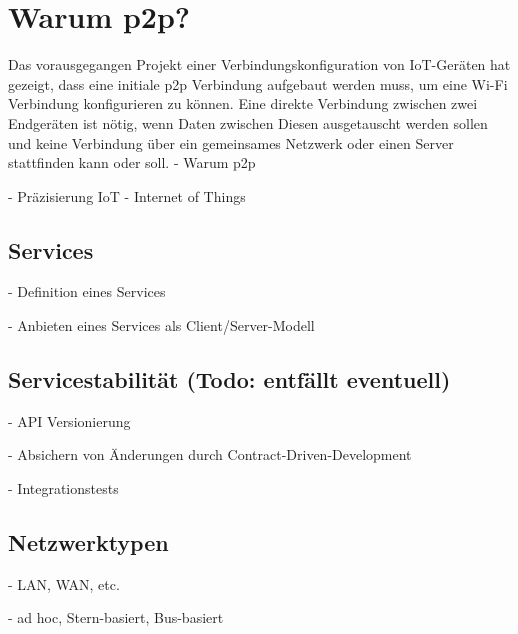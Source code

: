 \section{Warum p2p?}
    Das vorausgegangen Projekt einer Verbindungskonfiguration von IoT-Geräten \cite{aiProject} hat gezeigt, dass eine initiale p2p Verbindung aufgebaut werden muss, um eine Wi-Fi Verbindung konfigurieren zu können. Eine direkte Verbindung zwischen zwei Endgeräten ist nötig, wenn Daten zwischen Diesen ausgetauscht werden sollen und keine Verbindung über ein gemeinsames Netzwerk oder einen Server stattfinden kann oder soll.
    - Warum p2p

    - Präzisierung IoT - Internet of Things
    \subsection{Services}
    - Definition eines Services
    
    - Anbieten eines Services als Client/Server-Modell
    
    \subsection{Servicestabilität (Todo: entfällt eventuell)}
    - API Versionierung
    
    - Absichern von Änderungen durch Contract-Driven-Development
    
    - Integrationstests
    \subsection{Netzwerktypen}
		- LAN, WAN, etc.
		
		- ad hoc, Stern-basiert, Bus-basiert
